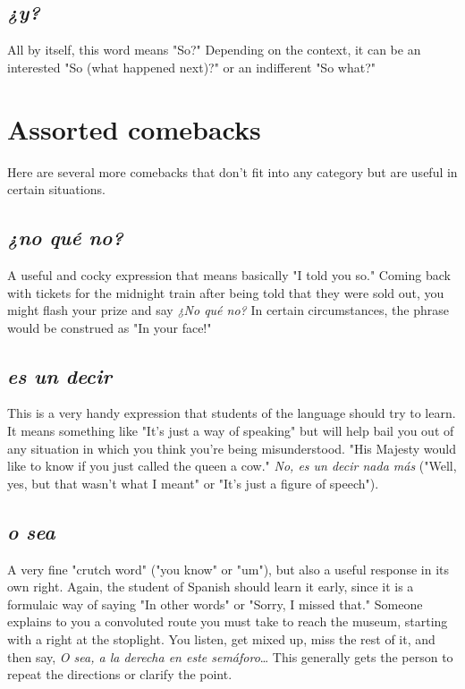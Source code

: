 \subsection{\emph{¿y?}}

All by itself, this word means "So?" Depending on the context,
it can be an interested "So (what happened next)?" or an indifferent
"So what?"

\section{Assorted comebacks}

Here are several more comebacks that don't fit into any category but are useful in certain situations.

\subsection{\emph{¿no qué no?}}

A useful and cocky expression that means basically "I told you
so." Coming back with tickets for the midnight train after being told
that they were sold out, you might flash your prize and say \emph{¿No qué
no?} In certain circumstances, the phrase would be construed as "In
your face!"

\subsection{\emph{es un decir}}

This is a very handy expression that students of the language
should try to learn. It means something like "It's just a way of speaking" but will help bail you out of any situation in which you think
you're being misunderstood. "His Majesty would like to know if you
just called the queen a cow." \emph{No, es un decir nada más} ("Well, yes, but
that wasn't what I meant" or "It's just a figure of speech").

\subsection{\emph{o sea}}

A very fine "crutch word" ("you know" or "um"), but also a
useful response in its own right. Again, the student of Spanish should
learn it early, since it is a formulaic way of saying "In other words" or
"Sorry, I missed that." Someone explains to you a convoluted route
you must take to reach the museum, starting with a right at the stoplight. You listen, get mixed up, miss the rest of it, and then say, \emph{O sea,
a la derecha en este semáforo}\ldots{} This generally gets the person to
repeat the directions or clarify the point.

